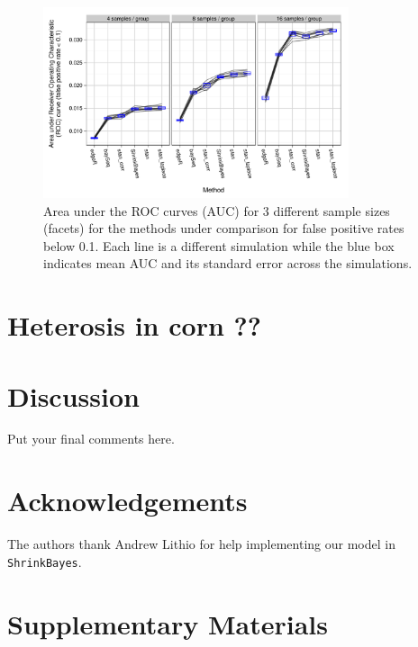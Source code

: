 \documentclass[useAMS,usenatbib,referee]{biom}
\begin{document}
\begin{figure}
\centerline{\includegraphics[width=0.8\textwidth]{auc-facet-TRUE}}
\caption{Area under the ROC curves (AUC) for 3 different sample sizes (facets) for the methods under comparison for false positive rates below 0.1. Each line is a different simulation while the blue box indicates mean AUC and its standard error across the simulations.}
\end{figure}

\section{Heterosis in corn ??}
\label{s:corn}

\section{Discussion}
\label{s:discuss}

Put your final comments here. 



\backmatter %



\section*{Acknowledgements}

The authors thank Andrew Lithio for help implementing our model in {\tt ShrinkBayes}.


\section*{Supplementary Materials}
\end{document}

